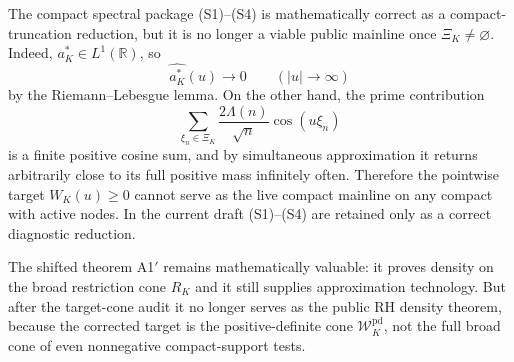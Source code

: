 \begin{remark}\label{rem:compact-scalar-obstruction}
The compact spectral package \textup{(S1)}--\textup{(S4)} is mathematically
correct as a compact-truncation reduction, but it is no longer a viable public
mainline once $\Xi_K\neq\varnothing$. Indeed, $a_K^*\in L^1(\mathbb R)$, so
\[
  \widehat{a_K^*}(u)\to0 \qquad (|u|\to\infty)
\]
by the Riemann--Lebesgue lemma. On the other hand, the prime contribution
\[
  \sum_{\xi_n\in\Xi_K}\frac{2\Lambda(n)}{\sqrt n}\cos(u\xi_n)
\]
is a finite positive cosine sum, and by simultaneous approximation it returns
arbitrarily close to its full positive mass infinitely often. Therefore the
pointwise target $W_K(u)\ge0$ cannot serve as the live compact mainline on any
compact with active nodes. In the current draft \textup{(S1)}--\textup{(S4)}
are retained only as a correct diagnostic reduction.
\end{remark}

\begin{remark}\label{rem:G1-frozen-target}
The shifted theorem A1$'$ remains mathematically valuable: it proves density on the broad restriction cone $R_K$ and it still supplies approximation technology. But after the target-cone audit it no longer serves as the public RH density theorem, because the corrected target is the positive-definite cone $\mathcal W_K^{\mathrm{pd}}$, not the full broad cone of even nonnegative compact-support tests.
\end{remark}
